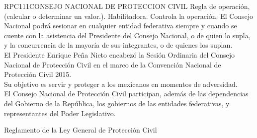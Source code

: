 \begin{BusinessRule}{RPC111}{CONSEJO NACIONAL DE PROTECCION CIVIL}{
		Regla de operación, (calcular o determinar un valor.).
	}{
		Habilitadora. 
	}{
		Controla la operación. %
	}
	\BRItem[Descripción:] El Consejo Nacional podrá sesionar en cualquier entidad federativa siempre y cuando se cuente con la asistencia del Presidente del Consejo Nacional, o de quien lo supla, y la concurrencia de la mayoría de sus integrantes, o de quienes los suplan.\\El Presidente Enrique Peña Nieto encabezó la Sesión Ordinaria del Consejo Nacional de Protección Civil en el marco de la Convención Nacional de Protección Civil 2015.\\Su objetivo es servir y proteger a los mexicanos en momentos de adversidad.\\El Consejo Nacional de Protección Civil participan, además de las dependencias del Gobierno de la República, los gobiernos de las entidades federativas, y representantes del Poder Legislativo.
	
	
	 Reglamento de la Ley General de Protección Civil
\end{BusinessRule}
